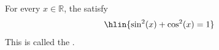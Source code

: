 \begin{proposition} \label{proposition:pythagorean_identity_for_sine_and_cosine_functions}
For every $x \in \mathbb{R}$, the  satisfy
$$\hlin{\sin^2(x) + \cos^2(x) = 1}$$
This is called the .
\end{proposition}
